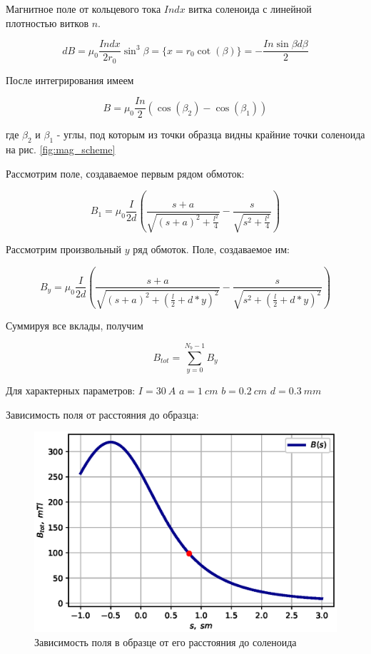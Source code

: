 \documentclass[10pt]{article}
\begin{document}
Магнитное поле от кольцевого тока $I n dx$ витка соленоида с линейной плотностью витков $n$.

\begin{equation}\label{eq:dB}
dB = \mu_0 \frac{I n dx}{2 r_0} \sin^3{\beta} = \{x = r_0 \cot(\beta)\} = - \frac{I n \sin{\beta} d\beta}{2}
\end{equation}

После интегрирования имеем

\begin{equation}\label{eq:B}
B = \mu_0 \frac{I n}{2} (\cos(\beta_2) - \cos(\beta_1))
\end{equation}

где $\beta_2$ и $\beta_1$ - углы, под которым из точки образца видны крайние точки соленоида на рис. \ref{fig:mag_scheme}

Рассмотрим поле, создаваемое первым рядом обмоток:

\begin{equation}\label{eq:B1}
B_1 = \mu_0 \frac{I}{2 d} (\frac{s+a}{\sqrt{(s+a)^2 + \frac{l^2}{4}}} - \frac{s}{\sqrt{s^2 + \frac{l^2}{4}}})
\end{equation}

Рассмотрим произвольный $y$ ряд обмоток. Поле, создаваемое им:

\begin{equation}\label{eq:By}
B_y = \mu_0 \frac{I}{2 d} (\frac{s+a}{\sqrt{(s+a)^2 + (\frac{l}{2} + d*y)^2}} - \frac{s}{\sqrt{s^2 + (\frac{l}{2} + d*y)^2}})
\end{equation}

Суммируя все вклады, получим 

\begin{equation}\label{eq:Btot}
B_{tot} = \sum_{y = 0}^{N_b - 1} B_y
\end{equation}

Для характерных параметров: 
$I = 30\ A$ 
$a = 1\ cm$ 
$b = 0.2\ cm$ 
$d = 0.3\ mm$ 

Зависимость поля от расстояния до образца:

\begin{figure}[h!]
	\centering
	\includegraphics[scale = 0.45]{B_s}
	\caption{Зависимость поля в образце от его расстояния до соленоида}
	\label{fig:B_s}
\end{figure}
\end{document}
